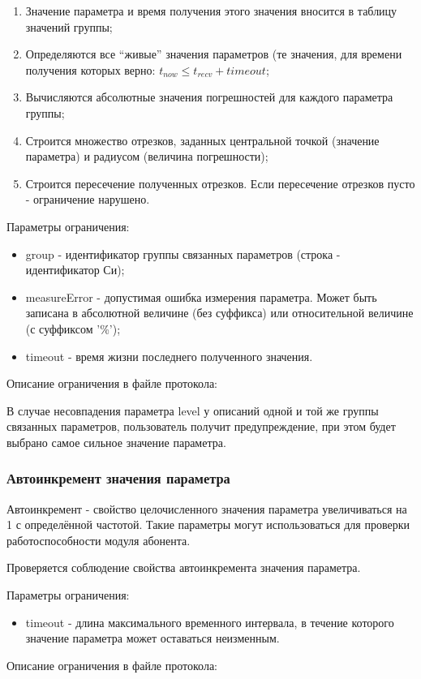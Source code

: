 \begin{enumerate}
 \item Значение параметра и время получения этого значения вносится в таблицу 
значений группы;
 \item Определяются все ``живые'' значения параметров (те значения, для времени 
получения которых верно: $t_{now} \leq t_{recv} + timeout$;
 \item Вычисляются абсолютные значения погрешностей для каждого параметра 
группы;
 \item Строится множество отрезков, заданных центральной точкой (значение 
параметра) и радиусом (величина погрешности);
 \item Строится пересечение полученных отрезков. Если пересечение отрезков 
пусто - ограничение нарушено.
\end{enumerate}

Параметры ограничения:
\begin{itemize}
 \item group - идентификатор группы связанных параметров (строка - 
идентификатор Си);
 \item measureError - допустимая ошибка измерения параметра. Может быть 
записана в абсолютной величине (без суффикса) или относительной величине (с 
суффиксом '\%');
 \item timeout - время жизни последнего полученного значения.
\end{itemize}

Описание ограничения в файле протокола:



В случае несовпадения параметра level у описаний одной и той же 
группы связанных параметров, пользователь получит предупреждение, при этом 
будет выбрано самое сильное значение параметра.

\subsubsection{Автоинкремент значения параметра}

Автоинкремент - свойство целочисленного значения параметра 
увеличиваться на 1 с определённой частотой. Такие параметры могут 
использоваться для проверки работоспособности модуля абонента.

Проверяется соблюдение свойства автоинкремента значения параметра.

Параметры ограничения:
\begin{itemize}
 \item timeout - длина максимального временного интервала, в течение которого 
значение параметра может оставаться неизменным.
\end{itemize}

Описание ограничения в файле протокола:


